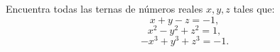 Encuentra todas las ternas de números reales $x,y,z$ tales que:
\[x+y-z=-1,\]
\[x^2-y^2+z^2=1,\]
\[-x^3+y^3+z^3=-1.\]